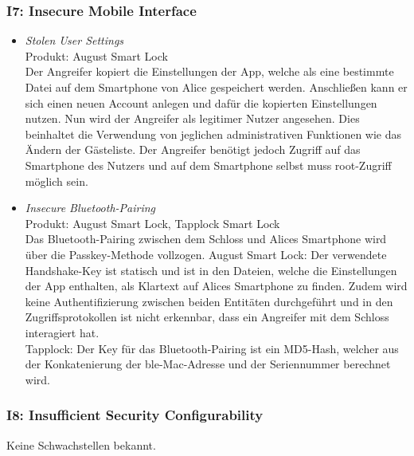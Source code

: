     \subsubsection*{I7: Insecure Mobile Interface}
        \begin{itemize}[leftmargin=0cm,label={}]
            \item \emph{Stolen User Settings}\cite{Ye2017}\label{vuln:usersettings}\\
                Produkt: August Smart Lock\\ 
                Der Angreifer kopiert die Einstellungen der App, welche als eine bestimmte Datei auf dem Smartphone von Alice gespeichert werden.
    		    Anschließen kann er sich einen neuen Account anlegen und dafür die kopierten Einstellungen nutzen.
    		    Nun wird der Angreifer als legitimer Nutzer angesehen.
    		    Dies beinhaltet die Verwendung von jeglichen administrativen Funktionen wie das Ändern der Gästeliste.
    		    Der Angreifer benötigt jedoch Zugriff auf das Smartphone des Nutzers und auf dem Smartphone selbst muss root-Zugriff möglich sein.
		    \item \emph{Insecure Bluetooth-Pairing}\cite{Tierney2018,Rose2016,Ye2017,Fuller2017}\label{vuln:blepairing}\\
                Produkt: August Smart Lock, Tapplock Smart Lock\\
                Das Bluetooth-Pairing zwischen dem Schloss und Alices Smartphone wird über die Passkey-Methode vollzogen. 
                August Smart Lock: Der verwendete Handshake-Key ist statisch und ist in den Dateien, welche die Einstellungen der App enthalten, als Klartext auf Alices Smartphone zu finden. 
                Zudem wird keine Authentifizierung zwischen beiden Entitäten durchgeführt und in den Zugriffsprotokollen ist nicht erkennbar, dass ein Angreifer mit dem Schloss interagiert hat.\\
                Tapplock: Der Key für das Bluetooth-Pairing ist ein MD5-Hash, welcher aus der Konkatenierung der \gls{ble}-Mac-Adresse und der Seriennummer berechnet wird.
        \end{itemize}
        
    \subsubsection*{I8: Insufficient Security Configurability}
        Keine Schwachstellen bekannt.
        
